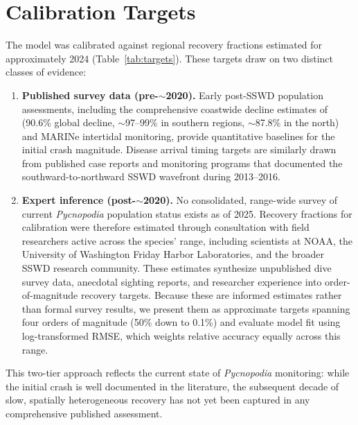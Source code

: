 \clearpage
\section{Calibration Targets}
\label{sec:appendix_targets}

The model was calibrated against regional recovery fractions estimated for
approximately 2024 (Table~\ref{tab:targets}).  These targets draw on two
distinct classes of evidence:

\begin{enumerate}
  \item \textbf{Published survey data (pre-$\sim$2020).}  Early post-SSWD
    population assessments, including the comprehensive coastwide decline
    estimates of \citet{gravem2021} (90.6\% global decline, $\sim$97--99\%
    in southern regions, $\sim$87.8\% in the north) and MARINe intertidal
    monitoring, provide quantitative baselines for the initial crash
    magnitude.  Disease arrival timing targets are similarly drawn from
    published case reports and monitoring programs that documented the
    southward-to-northward SSWD wavefront during 2013--2016.

  \item \textbf{Expert inference (post-$\sim$2020).}  No consolidated,
    range-wide survey of current \textit{Pycnopodia} population status
    exists as of 2025.  Recovery fractions for calibration were therefore
    estimated through consultation with field researchers active across
    the species' range, including scientists at NOAA, the University of
    Washington Friday Harbor Laboratories, and the broader SSWD research
    community.  These estimates synthesize unpublished dive survey data,
    anecdotal sighting reports, and researcher experience into
    order-of-magnitude recovery targets.  Because these are informed
    estimates rather than formal survey results, we present them as
    approximate targets spanning four orders of magnitude (50\% down to
    0.1\%) and evaluate model fit using log-transformed RMSE, which
    weights relative accuracy equally across this range.
\end{enumerate}

\noindent This two-tier approach reflects the current state of
\textit{Pycnopodia} monitoring: while the initial crash is well documented
in the literature, the subsequent decade of slow, spatially heterogeneous
recovery has not yet been captured in any comprehensive published
assessment.

